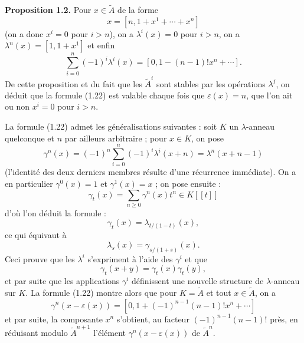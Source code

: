 \documentclass[11pt]{article}
\begin{document}
\textbf{Proposition 1.2.} Pour $x\in\widetilde A$ de la forme
\[
x=[n,1+x^1+\cdots+x^n]
\]
(on a donc $x^i=0$ pour $i>n$), on a $\lambda^i(x)=0$ pour $i>n$, on a $\lambda^n(x)=[1,1+x^1]$ et enfin
\begin{equation}\tag{1.22}
\sum_{i=0}^n(-1)^i\lambda^i(x)=[0,1-(n-1)!x^n+\cdots].
\end{equation}
De cette proposition et du fait que les $\widetilde A^i$ sont stables par les opérations $\lambda^j$, on déduit que la formule (1.22) est valable chaque fois que $\varepsilon(x)=n$, que l'on ait ou non $x^i=0$ pour $i>n$.

La formule (1.22) admet les généralisations suivantes : soit $K$ un $\lambda$-anneau quelconque et $n$ par ailleurs arbitraire ; pour $x\in K$, on pose
\begin{equation}\tag{1.23}
\gamma^n(x)=(-1)^n\sum_{i=0}^n(-1)^i\lambda^i(x+n)=\lambda^n(x+n-1)
\end{equation}
(l'identité des deux derniers membres résulte d'une récurrence immédiate). On a en particulier $\gamma^0(x)=1$ et $\gamma^1(x)=x$ ; on pose ensuite :
\begin{equation}\tag{1.24}
\gamma_t(x)=\sum_{n\geq0}\gamma^n(x)t^n\in K[[t]]
\end{equation}
d'où l'on déduit la formule :
\begin{equation}\tag{1.25}
\gamma_t(x)=\lambda_{t/(1-t)}(x),
\end{equation}
ce qui équivaut à
\begin{equation}\tag{1.25 bis}
\lambda_s(x)=\gamma_{s/(1+s)}(x).
\end{equation}
Ceci prouve que les $\lambda^i$ s'expriment à l'aide des $\gamma^i$ et que
\[
\gamma_t(x+y)=\gamma_t(x)\gamma_t(y),
\]
et par suite que les applications $\gamma^i$ définissent une nouvelle structure de $\lambda$-anneau sur $K$. La formule (1.22) montre alors que pour $K=\widetilde A$ et tout $x\in\widetilde A$, on a
\begin{equation}\tag{1.22 bis}
\gamma^n(x-\varepsilon(x))=[0,1+(-1)^{n-1}(n-1)!x^n+\cdots]
\end{equation}
et par suite, la composante $x^n$ s'obtient, au facteur $(-1)^{n-1}(n-1)!$ près, en réduisant modulo $\widetilde A^{n+1}$ l'élément $\gamma^n(x-\varepsilon(x))$ de $\widetilde A^n$.
\end{document}
